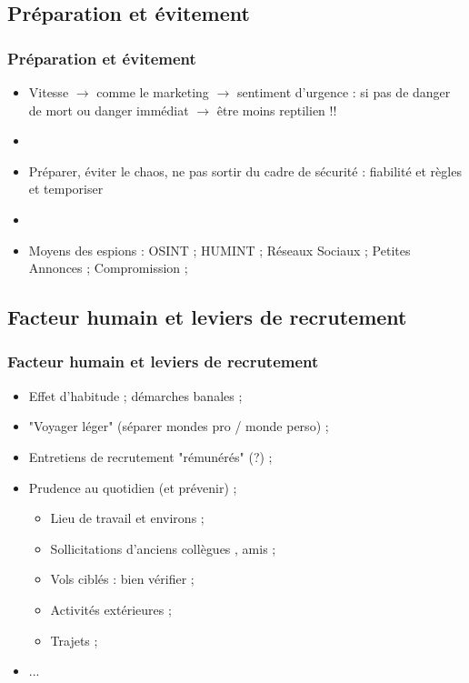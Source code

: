 \documentclass[slidetop,11pt]{beamer}
\begin{document}
\subsection{Pr{\'e}paration et {\'e}vitement}
\begin{frame}
	\frametitle{Pr{\'e}paration et {\'e}vitement}
	\begin{itemize}
		\item Vitesse $\rightarrow$ comme le marketing $\rightarrow$ sentiment d'urgence : si pas de danger de mort ou danger imm{\'e}diat $\rightarrow$ {\^e}tre moins reptilien !!
		\item[] 
		\item Pr{\'e}parer, {\'e}viter le chaos, ne pas sortir du cadre de s{\'e}curit{\'e} : fiabilit{\'e} et r{\`e}gles et temporiser
		\item[]
		\item Moyens des espions : OSINT ; HUMINT ; R{\'e}seaux Sociaux ; Petites Annonces ; Compromission ; 
	\end{itemize}
\end{frame}

\subsection{Facteur humain et leviers de recrutement}
\begin{frame}
	\frametitle{Facteur humain et leviers de recrutement}
	\begin{itemize}
		\item Effet d'habitude ; d{\'e}marches banales ; 
		\item "Voyager l{\'e}ger" (s{\'e}parer mondes pro / monde perso) ; 
		\item Entretiens de recrutement "r{\'e}mun{\'e}r{\'e}s" (?) ; 
		\item Prudence au quotidien (et pr{\'e}venir) ; 
		\begin{itemize}
			\item Lieu de travail et environs ; 
			\item Sollicitations d'anciens coll{\`e}gues , amis ; 
			\item Vols cibl{\'e}s : bien v{\'e}rifier ; 
			\item Activit{\'e}s ext{\'e}rieures ; 
			\item Trajets ; 
		\end{itemize}
		\item ...
	\end{itemize}
\end{frame}

\end{document}
